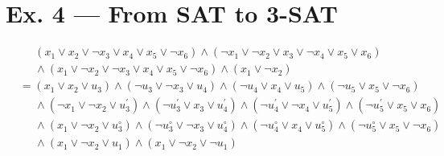 \documentclass[12pt, a4paper]{article}
\begin{document}
\section*{Ex. 4 --- From SAT to 3-SAT}
\begin{align*}
    &\quad\ \, (x_1\vee x_2\vee \lnot x_3\vee x_4\vee x_5\vee \lnot x_6) \wedge (\lnot x_1\vee \lnot x_2\vee x_3\vee \lnot x_4\vee x_5\vee x_6)\\
    &\quad\ \, \wedge (x_1\vee \lnot x_2\vee \lnot x_3\vee x_4\vee x_5\vee \lnot x_6) \wedge (x_1\vee \lnot x_2)\\
    &= (x_1\vee x_2\vee u_3) \wedge (\lnot u_3\vee \lnot x_3\vee u_4) \wedge (\lnot u_4\vee x_4\vee u_5) \wedge (\lnot u_5\vee x_5\vee \lnot x_6)\\
    &\quad\ \, \wedge (\lnot x_1\vee \lnot x_2\vee u_3^\prime) \wedge (\lnot u_3^\prime \vee x_3\vee u_4^\prime) \wedge (\lnot u_4^\prime \vee \lnot x_4\vee u_5^\prime) \wedge (\lnot u_5^\prime \vee x_5\vee x_6)\\
    &\quad\ \, \wedge (x_1\vee \lnot x_2\vee u_3^\circ) \wedge (\lnot u_3^\circ \vee \lnot x_3\vee u_4^\circ) \wedge (\lnot u_4^\circ \vee x_4\vee u_5^\circ) \wedge (\lnot u_5^\circ \vee x_5\vee \lnot x_6)\\
    &\quad\ \, \wedge (x_1\vee \lnot x_2\vee u_1) \wedge (x_1\vee \lnot x_2\vee \lnot u_1)
\end{align*}
\end{document}
